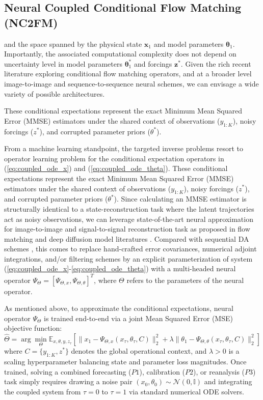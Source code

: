 \documentclass[10pt]{article}
\begin{document}
\subsection{Neural Coupled Conditional Flow Matching (NC2FM)}
\label{sec: nc2fm}

 
 
 
 and the space spanned by the physical state $\mathbf{x}_1$ and model parameters $\mathbf{\theta}_1$. Importantly, the associated computational complexity does not depend on uncertainty level in model parameters $\mathbf{\theta}_1^*$ and forcings $\mathbf{z}^*$. Given the rich recent literature exploring conditional flow matching operators, and at a broader level image-to-image and sequence-to-sequence neural schemes, we can envisage a wide variety of possible architectures.


These conditional expectations represent the exact Minimum Mean Squared Error (MMSE) estimators under the shared context of observations ($y_{1:K}$), noisy forcings ($z^*$), and corrupted parameter priors ($\theta^*$).


From a machine learning standpoint, the targeted inverse problems resort to operator learning problem for the conditional expectation operators in (\ref{eq:coupled_ode_x}) and (\ref{eq:coupled_ode_theta}).  These conditional expectations represent the exact Minimum Mean Squared Error (MMSE) estimators under the shared context of observations ($y_{1:K}$), noisy forcings ($z^*$), and corrupted parameter priors ($\theta^*$). Since calculating an MMSE estimator is structurally identical to a state-reconstruction task where the latent trajectories act as noisy observations, we can leverage state-of-the-art neural approximation for image-to-image and signal-to-signal reconstruction task as proposed in flow matching and deep diffusion model literatures \cite{}. Compared with sequential DA schemes \cite{carrassi_data_2018}, this comes to replace hand-crafted error covariances,  numerical adjoint integrations, and/or filtering schemes by an explicit parameterization of  system (\ref{eq:coupled_ode_x}-\ref{eq:coupled_ode_theta}) with a multi-headed neural operator $\Psi_{\Theta}=[\Psi_{\Theta,x},\Psi_{\Theta,\theta}]^{T}$,  where $\Theta$ refers to the parameters of the neural operator.

 As mentioned above, to approximate the conditional expectations, neural operator $\Psi_{\Theta}$ is trained end-to-end via a joint Mean Squared Error (MSE) objective function:
\begin{equation}
    \hat{\Theta}=\arg\min_{\Theta}\mathbb{E}_{x,\theta,y,z_{\tau}}\left[\|x_1-\Psi_{\Theta,x}(x_\tau,\theta_\tau, C)\|_{2}^{2} + \lambda\|\theta_1-\Psi_{\Theta,\theta}(x_\tau,\theta_\tau, C)\|_{2}^{2}\right] \label{eq:cfm_loss}
\end{equation}
where $C = \{y_{1:K}, z^*\}$ denotes the global operational context, and $\lambda>0$ is a scaling hyperparameter balancing state and parameter loss magnitudes. Once trained, solving a combined forecasting ($P1$), calibration ($P2$), or reanalysis ($P3$) task simply requires drawing a noise pair $(x_0, \theta_0) \sim \mathcal{N}(0, \mathbb{I})$ and integrating the coupled system from $\tau=0$ to $\tau=1$ via standard numerical ODE solvers.
\end{document}
